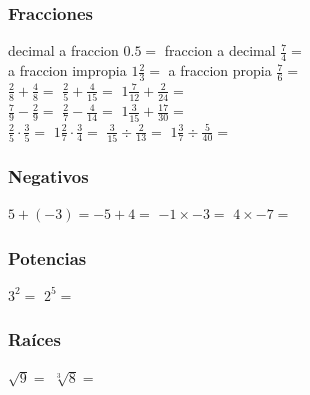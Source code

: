 \documentclass[a4paper,10pt]{article}
\begin{document}
\subsubsection*{Fracciones}
decimal a fraccion  $0.5=$\hspace{1.5cm}
fraccion a decimal  $\frac{7}{4}=$\hspace{1.5cm}
 \vspace{1cm}\\
a fraccion impropia $1\frac{2}{3}=$\hspace{1.5cm}
a fraccion propia   $\frac{7}{6}=$\hspace{1.5cm}
\vspace{1cm}\\
$\frac{2}{8}+\frac{4}{8}=$\hspace{3cm}
$\frac{2}{5}+\frac{4}{15}=$\hspace{3cm}
$1\frac{7}{12}+\frac{2}{24}=$\hspace{3cm}
\vspace{1cm}\\
$\frac{7}{9}-\frac{2}{9}=$\hspace{3cm}
$\frac{2}{7}-\frac{4}{14}=$\hspace{3cm}
$1\frac{3}{15}+\frac{17}{30}=$\hspace{3cm}
\vspace{1cm}\\
$\frac{2}{5}\cdot\frac{3}{5}=$\hspace{2cm}
$1\frac{2}{7}\cdot\frac{3}{4}=$\hspace{2cm}
$\frac{3}{15} \div\frac{2}{13}=$\hspace{2cm}
$1\frac{3}{7} \div\frac{5}{40}=$\hspace{2cm}

\subsubsection*{Negativos}
$5+(-3)=$\hspace{2cm}$-5+4=$ \hspace{2cm} $-1\times -3=$\hspace{2cm} $4\times -7=$

\subsubsection*{Potencias}
$3^2=$\hspace{2cm}
$2^5=$

\subsubsection*{Raíces}
$\sqrt{9}=$\hspace{2cm}
$\sqrt[3]{8}=$\hspace{2cm}
\end{document}

